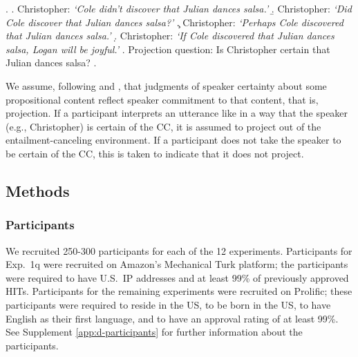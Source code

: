 \documentclass[a4paper,12pt,twoside]{article}
\begin{document}
	\ex. \label{ex:certain-that}
		\a. Christopher: \emph{\lq Cole didn't discover that Julian dances salsa.\rq}
		\b. Christopher: \emph{\lq Did Cole discover that Julian dances salsa?\rq}
		\c. Christopher: \emph{\lq Perhaps Cole discovered that Julian dances salsa.\rq}
		\d. Christopher: \emph{\lq If Cole discovered that Julian dances salsa, Logan will be joyful.\rq}
		\z.
		Projection question: Is Christopher certain that Julian dances salsa?
	\z.

    We assume, following \citealt{tonhauser_how_2018} and \citealt{degen_are_2022}, that judgments of speaker certainty about some propositional content reflect speaker commitment to that content, that is, projection. If a participant interprets an utterance like \Last[a--d] in a way that the speaker (e.g., Christopher) is certain of the CC, it is assumed to project out of the entailment-canceling environment. If a participant does not take the speaker to be certain of the CC, this is taken to indicate that it does not project.



	\subsection{Methods}

		\subsubsection{Participants}
			We recruited 250-300 participants for each of the 12 experiments. Participants for Exp.~1q were recruited on Amazon's Mechanical Turk platform; the participants were required to have U.S.\ IP addresses and at least 99\% of previously approved HITs. Participants for the remaining experiments were recruited on Prolific; these participants were required to reside in the US, to be born in the US, to have English as their first language, and to have an approval rating of at least 99\%. See Supplement \ref{app:d-participants} for further information about the participants. 
			
\end{document}
